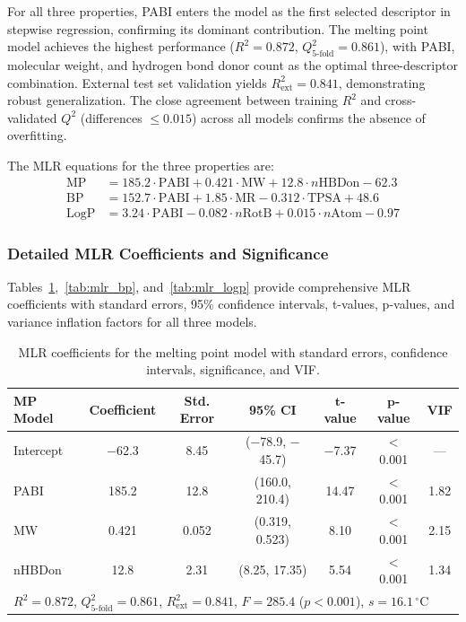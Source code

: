 \documentclass[12pt,a4paper]{article}
\begin{document}
For all three properties, PABI enters the model as the first selected descriptor in stepwise regression, confirming its dominant contribution. The melting point model achieves the highest performance ($R^2 = 0.872$, $Q^2_{5\text{-fold}} = 0.861$), with PABI, molecular weight, and hydrogen bond donor count as the optimal three-descriptor combination. External test set validation yields $R^2_{\text{ext}} = 0.841$, demonstrating robust generalization. The close agreement between training $R^2$ and cross-validated $Q^2$ (differences $\leq 0.015$) across all models confirms the absence of overfitting.

The MLR equations for the three properties are:
\begin{align}
\text{MP} &= 185.2 \cdot \text{PABI} + 0.421 \cdot \text{MW} + 12.8 \cdot n\text{HBDon} - 62.3 \label{eq:mp_model} \\
\text{BP} &= 152.7 \cdot \text{PABI} + 1.85 \cdot \text{MR} - 0.312 \cdot \text{TPSA} + 48.6 \label{eq:bp_model} \\
\text{LogP} &= 3.24 \cdot \text{PABI} - 0.082 \cdot n\text{RotB} + 0.015 \cdot n\text{Atom} - 0.97 \label{eq:logp_model}
\end{align}

\subsubsection{Detailed MLR Coefficients and Significance}

Tables~\ref{tab:mlr_mp},~\ref{tab:mlr_bp}, and~\ref{tab:mlr_logp} provide comprehensive MLR coefficients with standard errors, 95\% confidence intervals, t-values, p-values, and variance inflation factors for all three models.

\begin{table}[H]
\centering
\caption{MLR coefficients for the melting point model with standard errors, confidence intervals, significance, and VIF.}
\label{tab:mlr_mp}
\begin{tabular}{@{}lcccccc@{}}
\toprule
\textbf{MP Model} & \textbf{Coefficient} & \textbf{Std. Error} & \textbf{95\% CI} & $\mathbf{t}$-\textbf{value} & $\mathbf{p}$-\textbf{value} & \textbf{VIF} \\
\midrule
Intercept & $-$62.3 & 8.45 & ($-$78.9, $-$45.7) & $-$7.37 & $<$0.001 & --- \\
PABI & 185.2 & 12.8 & (160.0, 210.4) & 14.47 & $<$0.001 & 1.82 \\
MW & 0.421 & 0.052 & (0.319, 0.523) & 8.10 & $<$0.001 & 2.15 \\
nHBDon & 12.8 & 2.31 & (8.25, 17.35) & 5.54 & $<$0.001 & 1.34 \\
\midrule
\multicolumn{7}{l}{$R^2 = 0.872$, $Q^2_{5\text{-fold}} = 0.861$, $R^2_{\text{ext}} = 0.841$, $F = 285.4$ ($p < 0.001$), $s = 16.1\,^{\circ}\text{C}$} \\
\bottomrule
\end{tabular}
\end{table}
\end{document}
